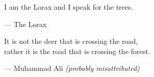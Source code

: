 \begin{flushright}
\begin{hangleftquote}{\QENOpen}{\QENClose}
I am the Lorax and I speak for the trees.
\end{hangleftquote}
\par\smallskip
\normalfont — The Lorax
\end{flushright}
\vspace{2em}
\begin{flushright}
\begin{hangleftquote}{\QENOpen}{\QENClose}
It is not the deer that is crossing the road,\\
rather it is the road that is crossing the forest.
\end{hangleftquote}
\par\smallskip
\normalfont — Muhammad Ali \textit{(probably misattributed)}
\end{flushright}
